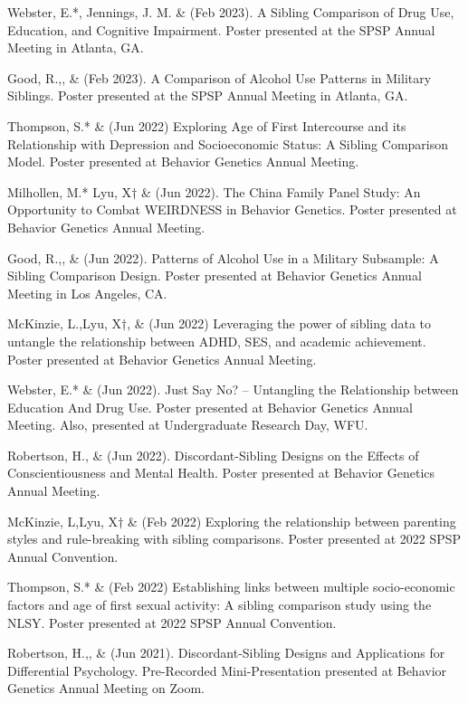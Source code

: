 \begin{etaremune}
\item Webster, E.*, Jennings, J. M. \& \meb (Feb 2023). A Sibling Comparison of Drug Use, Education, and Cognitive Impairment. Poster presented at the SPSP Annual Meeting in Atlanta, GA.
\item Good, R.,\noteA \yrh, \&  \meb (Feb 2023). A Comparison of Alcohol Use Patterns in Military Siblings.  Poster presented at the SPSP Annual Meeting in Atlanta, GA.
%
\item Thompson, S.* \& \meb (Jun 2022) Exploring Age of First Intercourse and its Relationship with Depression and Socioeconomic Status: A Sibling Comparison Model.  Poster presented at Behavior Genetics Annual Meeting.
\item Milhollen, M.* Lyu, X$\dagger$ \&  \meb (Jun 2022). The China Family Panel Study: An Opportunity to Combat WEIRDNESS in Behavior Genetics. Poster presented at Behavior Genetics Annual Meeting.
\item Good, R.,\noteA \yrh, \&  \meb (Jun 2022). Patterns of Alcohol Use in a Military Subsample: A Sibling Comparison Design.  Poster presented at Behavior Genetics Annual Meeting in Los Angeles, CA.
%
\item McKinzie, L.,\noteA Lyu, X$\dagger$, \& \meb (Jun 2022) Leveraging the power of sibling data to untangle the relationship between ADHD, SES, and academic achievement. Poster presented at Behavior Genetics Annual Meeting.
%
\item Webster, E.* \& \meb (Jun 2022). Just Say No? – Untangling the Relationship between Education And Drug Use. Poster presented at Behavior Genetics Annual Meeting. Also, presented at Undergraduate Research Day, WFU.
%
\item Robertson, H.\noteA \jdt, \Joe \&  \meb (Jun 2022). Discordant-Sibling Designs on the Effects of Conscientiousness and Mental Health. Poster presented at Behavior Genetics Annual Meeting.
%
\item McKinzie, L,\noteA Lyu, X$\dagger$ \& \meb (Feb 2022) Exploring the relationship between parenting styles and rule-breaking with sibling comparisons. Poster presented at 2022 SPSP Annual Convention.
%
\item Thompson, S.* \& \meb (Feb 2022) Establishing links between multiple socio-economic factors and age of first sexual activity: A sibling comparison study using the NLSY. Poster presented at 2022 SPSP Annual Convention.
%
\item Robertson, H.,\noteA \Joe, \&  \meb (Jun 2021). Discordant-Sibling Designs and Applications for Differential Psychology. Pre-Recorded Mini-Presentation presented at Behavior Genetics Annual Meeting on Zoom.

\end{etaremune}
